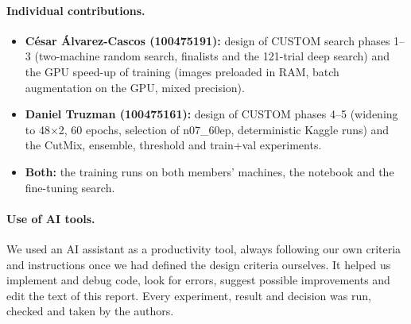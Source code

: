 \paragraph{Individual contributions.}
\begin{itemize}
  \item \textbf{César Álvarez-Cascos (100475191):} design of CUSTOM search phases 1--3 (two-machine random search, finalists and the 121-trial deep search) and the GPU speed-up of training (images preloaded in RAM, batch augmentation on the GPU, mixed precision).
  \item \textbf{Daniel Truzman (100475161):} design of CUSTOM phases 4--5 (widening to 48$\times$2, 60 epochs, selection of n07\_60ep, deterministic Kaggle runs) and the CutMix, ensemble, threshold and train+val experiments.
  \item \textbf{Both:} the training runs on both members' machines, the notebook and the fine-tuning search.
\end{itemize}

\paragraph{Use of AI tools.} We used an AI assistant as a productivity tool, always following our own criteria and instructions once we had defined the design criteria ourselves. It helped us implement and debug code, look for errors, suggest possible improvements and edit the text of this report. Every experiment, result and decision was run, checked and taken by the authors.
